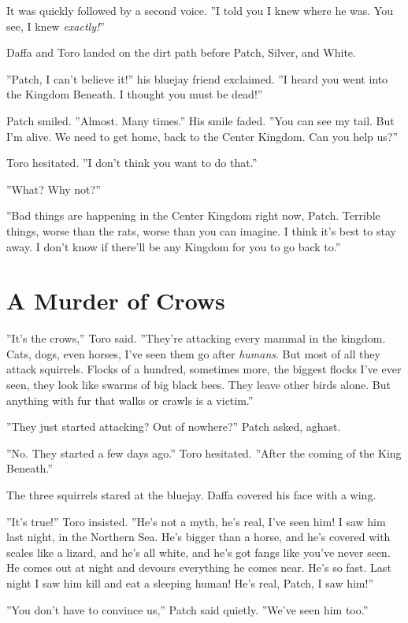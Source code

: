 \documentclass[12pt]{book}
\begin{document}
It was quickly followed by a second voice. ''I told you I knew where he was. You see, I knew {\it exactly!}''

Daffa and Toro landed on the dirt path before Patch, Silver, and White.

''Patch, I can't believe it!'' his bluejay friend exclaimed. ''I heard you went into the Kingdom Beneath. I thought you must be dead!''

Patch smiled. ''Almost. Many times.'' His smile faded. ''You can see my tail. But I'm alive. We need to get home, back to the Center Kingdom. Can you help us?''

Toro hesitated. ''I don't think you want to do that.''

''What? Why not?''

''Bad things are happening in the Center Kingdom right now, Patch. Terrible things, worse than the rats, worse than you can imagine. I think it's best to stay away. I don't know if there'll be any Kingdom for you to go back to.''


\section{A Murder of Crows}

''It's the crows,'' Toro said. ''They're attacking every mammal in the kingdom. Cats, dogs, even horses, I've seen them go after {\it humans}. But most of all they attack squirrels. Flocks of a hundred, sometimes more, the biggest flocks I've ever seen, they look like swarms of big black bees. They leave other birds alone. But anything with fur that walks or crawls is a victim.''

''They just started attacking? Out of nowhere?'' Patch asked, aghast.

''No. They started a few days ago.'' Toro hesitated. ''After the coming of the King Beneath.''

The three squirrels stared at the bluejay. Daffa covered his face with a wing.

''It's true!'' Toro insisted. ''He's not a myth, he's real, I've seen him! I saw him last night, in the Northern Sea. He's bigger than a horse, and he's covered with scales like a lizard, and he's all white, and he's got fangs like you've never seen. He comes out at night and devours everything he comes near. He's so fast. Last night I saw him kill and eat a sleeping human! He's real, Patch, I saw him!''

''You don't have to convince us,'' Patch said quietly. ''We've seen him too.''
\end{document}
